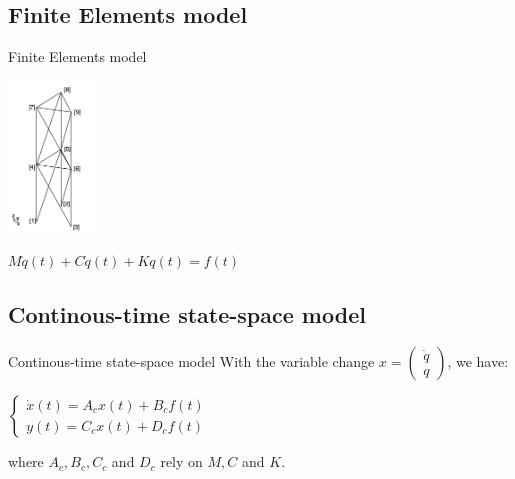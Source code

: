\documentclass{beamer}
\begin{document}
\subsection{Finite Elements model}
\begin{frame}{Finite Elements model}

\begin{center}
\includegraphics[height=4cm]{images/finite_element.png}

$M \ddot{q}(t) + C \dot{q}(t) + K q(t) = f(t)$
\end{center}

\end{frame}

\subsection{Continous-time state-space model}
\begin{frame}{Continous-time state-space model}
With the variable change $x =
\begin{pmatrix}
\dot{q} \\
q
\end{pmatrix}$, we have:


\begin{center}
$\left\{
\begin{array}{ll}
\dot{x}(t) = A_cx(t) + B_cf(t) \\
y(t) = C_cx(t) + D_cf(t)
\end{array}
\right.$
\end{center}

where $A_c, B_c, C_c$ and $D_c$ rely on $M, C$ and $K$.

\end{frame}
\end{document}
